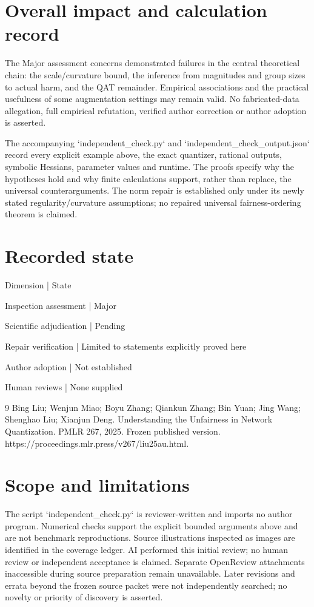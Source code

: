 \documentclass[10pt]{article}
\begin{document}
\section*{Overall impact and calculation record}
The Major assessment concerns demonstrated failures in the central theoretical chain: the scale/curvature bound, the inference from magnitudes and group sizes to actual harm, and the QAT remainder. Empirical associations and the practical usefulness of some augmentation settings may remain valid. No fabricated-data allegation, full empirical refutation, verified author correction or author adoption is asserted.\par
The accompanying `independent\_check.py` and `independent\_check\_output.json` record every explicit example above, the exact quantizer, rational outputs, symbolic Hessians, parameter values and runtime. The proofs specify why the hypotheses hold and why finite calculations support, rather than replace, the universal counterarguments. The norm repair is established only under its newly stated regularity/curvature assumptions; no repaired universal fairness-ordering theorem is claimed.\par
\section*{Recorded state}
Dimension | State\par
Inspection assessment | Major\par
Scientific adjudication | Pending\par
Repair verification | Limited to statements explicitly proved here\par
Author adoption | Not established\par
Human reviews | None supplied\par
9 Bing Liu; Wenjun Miao; Boyu Zhang; Qiankun Zhang; Bin Yuan; Jing Wang; Shenghao Liu; Xianjun Deng. Understanding the Unfairness in Network Quantization. PMLR 267, 2025. Frozen published version. https://proceedings.mlr.press/v267/liu25au.html.\par
\section*{Scope and limitations}
The script `independent\_check.py` is reviewer-written and imports no author program. Numerical checks support the explicit bounded arguments above and are not benchmark reproductions. Source illustrations inspected as images are identified in the coverage ledger. AI performed this initial review; no human review or independent acceptance is claimed. Separate OpenReview attachments inaccessible during source preparation remain unavailable. Later revisions and errata beyond the frozen source packet were not independently searched; no novelty or priority of discovery is asserted.\par
\end{document}
